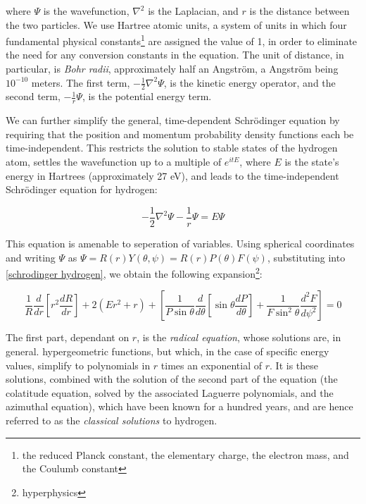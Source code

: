 \documentclass{article}
\begin{document}
where $\Psi$ is the wavefunction, $\nabla^2$ is the Laplacian,
and $r$ is the distance between the two particles.  We use Hartree atomic units,
a system of units in which four fundamental physical constants\footnote{the reduced Planck
constant, the elementary charge, the electron mass, and the Coulumb constant} are
assigned the value of 1, in order to eliminate the need for any
conversion constants in the equation.  The unit of distance, in particular,
is {\it Bohr radii}, approximately half an Angstr\"om, a
Angstr\"om being $10^{-10}$ meters.  The first term, $-\frac{1}{2}\nabla^2 \Psi$,
is the kinetic energy operator, and the second term, $-\frac{1}{r}\Psi$, is
the potential energy term.

We can further simplify the general, time-dependent Schr\"odinger equation
by requiring that the position and momentum probability density functions
each be time-independent.  This restricts the solution to stable states
of the hydrogen atom, settles the wavefunction up to a multiple of $e^{itE}$,
where $E$ is the state's energy in Hartrees (approximately 27 eV),
and leads to the time-independent Schr\"odinger equation for hydrogen:

\begin{equation}
\label{schrodinger hydrogen}
-\frac{1}{2}\nabla^2 \Psi - \frac{1}{r}\Psi = E \Psi
\end{equation}

This equation is amenable to seperation of variables.
Using spherical coordinates and writing $\Psi$ as $\Psi=R(r)Y(\theta, \psi) = R(r)P(\theta)F(\psi)$,
substituting into \eqref{schrodinger hydrogen}, we obtain the following expansion\footnote{hyperphysics}:

\begin{equation*}
\frac{1}{R} \frac{d}{dr}\left[ r^2 \frac{dR}{dr}\right] + 2(Er^2 + r)
+ \left[\frac{1}{P\sin\theta} \frac{d}{d\theta}\left[\sin\theta\frac{dP}{d\theta}\right]+\frac{1}{F\sin^2\theta}\frac{d^2 F}{d\psi^2}\right] = 0
\end{equation*}

The first part, dependant on $r$, is the {\it radical equation}, whose solutions are, in general.
hypergeometric functions, but which, in the case of specific energy values,
simplify to polynomials in $r$
times an exponential of $r$.  It is these solutions, combined with the solution
of the second part of the equation (the colatitude equation, solved by the associated Laguerre polynomials,
and the azimuthal equation), which have been known for a hundred years, and are
hence referred to as the {\it classical solutions} to hydrogen.
\end{document}
